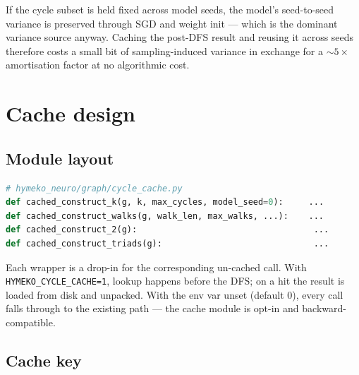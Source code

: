 \documentclass[11pt,a4paper]{article}
\begin{document}
If the cycle subset is held fixed across model seeds, the model's
seed-to-seed variance is preserved through SGD and weight init ---
which is the dominant variance source anyway.  Caching the post-DFS
result and reusing it across seeds therefore costs a small bit of
sampling-induced variance in exchange for a $\sim 5\times$
amortisation factor at no algorithmic cost.

\section{Cache design}

\subsection*{Module layout}

\begin{lstlisting}[language=Python]
# hymeko_neuro/graph/cycle_cache.py
def cached_construct_k(g, k, max_cycles, model_seed=0):     ...
def cached_construct_walks(g, walk_len, max_walks, ...):    ...
def cached_construct_2(g):                                   ...
def cached_construct_triads(g):                              ...
\end{lstlisting}

Each wrapper is a drop-in for the corresponding un-cached call.
With \texttt{HYMEKO\_CYCLE\_CACHE=1}, lookup happens before the
DFS; on a hit the result is loaded from disk and unpacked.  With
the env var unset (default $0$), every call falls through to the
existing path --- the cache module is opt-in and
backward-compatible.

\subsection*{Cache key}

\begin{center}
\end{center}
\end{document}
